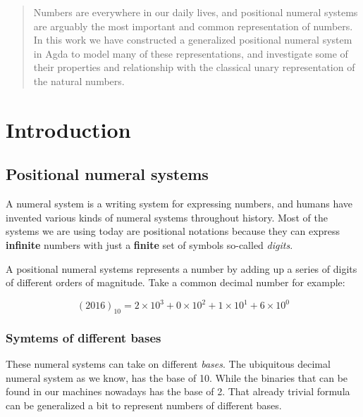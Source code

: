 \documentclass[12pt, a4paper]{article}
\begin{document}
\maketitle

\begin{abstract}
Numbers are everywhere in our daily lives, and positional numeral systems are
arguably the most important and common representation of numbers. In this work
we have constructed a generalized positional numeral system in Agda to model many
of these representations, and investigate some of their properties and relationship
with the classical unary representation of the natural numbers.

\end{abstract}

\section{Introduction}

\subsection{Positional numeral systems}\label{num}

A numeral system is a writing system for expressing numbers, and humans have
invented various kinds of numeral systems throughout history. Most of the
systems we are using today are positional notations\cite{knuth1998art} because
they can express \textbf{infinite} numbers with just a \textbf{finite} set of
symbols so-called \textit{digits}.

A positional numeral systems represents a number by adding up a series of digits
of different orders of magnitude. Take a common decimal number for example:

$$ (2016)_{10} = 2\times10^3 + 0\times10^2 + 1\times10^1 + 6\times10^0 $$

\subsubsection{Symtems of different bases}

These numeral systems can take on different \textit{bases}. The ubiquitous decimal
numeral system as we know, has the base of 10. While the binaries that can be found
in our machines nowadays has the base of 2. That already trivial formula can
be generalized a bit to represent numbers of different bases.
\end{document}
